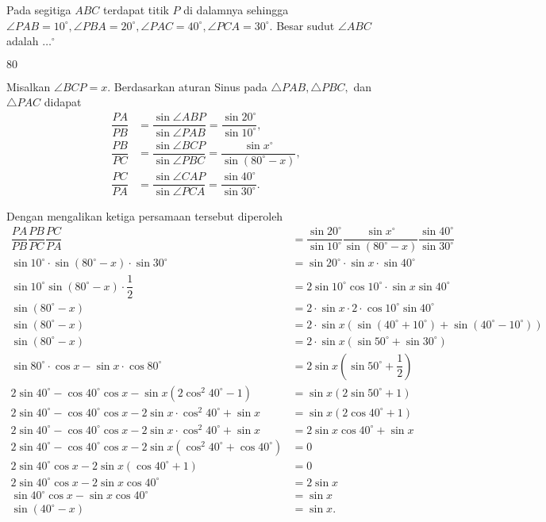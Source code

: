 \documentclass[11pt]{scrartcl}
\begin{document}
	\begin{soalbaru}
		Pada segitiga $ABC$ terdapat titik $P$ di dalamnya sehingga $\angle PAB = 10^\circ, \angle PBA = 20^\circ , \angle PAC = 40^\circ, \angle PCA = 30^\circ$. Besar sudut $\angle ABC$ adalah $\dots^\circ$ 
		
		\begin{jawaban}
				$80$
		\end{jawaban}
		\begin{solusi}
		Misalkan $\angle BCP = x$. Berdasarkan aturan Sinus pada $\triangle PAB, \triangle PBC,$ dan $\triangle PAC$ didapat
		\begin{align*}
		\dfrac{PA}{PB} &= \dfrac{\sin \angle ABP}{\sin \angle PAB} = \dfrac{\sin 20^\circ}{\sin 10^\circ}, \\
		\dfrac{PB}{PC} &= \dfrac{\sin \angle BCP}{\sin \angle PBC} = \dfrac{\sin x^\circ}{\sin (80
		^\circ-x)}, \\
		\dfrac{PC}{PA} &= \dfrac{\sin \angle CAP}{\sin \angle PCA} = \dfrac{\sin 40^\circ}{\sin 30^\circ}.
		\end{align*}
		
		Dengan mengalikan ketiga persamaan tersebut diperoleh
		\begin{align*}
		\dfrac{PA}{PB}\dfrac{PB}{PC}\dfrac{PC}{PA}&=\dfrac{\sin 20^\circ}{\sin 10^\circ}\dfrac{\sin x^\circ}{\sin (80^\circ-x)}\dfrac{\sin 40^\circ}{\sin 30^\circ}\\
		\sin 10^\circ \cdot \sin (80^\circ-x)\cdot \sin 30^\circ &= \sin 20^\circ\cdot \sin x \cdot \sin 40^\circ\\
		\sin 10^\circ \sin (80^\circ-x)\cdot \dfrac{1}{2}&=2\sin 10^\circ \cos 10^\circ\cdot \sin x \sin 40^\circ\\
		\sin (80^\circ-x)&=2\cdot\sin x \cdot 2\cdot \cos 10^\circ \sin 40^\circ\\
		\sin(80^\circ-x)&=2\cdot\sin x(\sin(40^\circ+10^\circ)+\sin(40^\circ-10^\circ))\\
		\sin(80^\circ-x)&=2\cdot\sin x(\sin50^\circ+\sin 30^\circ)\\
		\sin 80^\circ\cdot\cos x-\sin x\cdot \cos 80^\circ &= 2\sin x(\sin 50^\circ +\dfrac{1}{2})\\
		2\sin40^\circ-\cos 40^\circ\cos x-\sin x(2\cos^2 40^\circ-1)&=\sin x(2\sin 50^\circ+1)\\
		2\sin40^\circ-\cos 40^\circ\cos x-2\sin x\cdot\cos^2 40^\circ+\sin x &= \sin x (2 \cos 40^\circ+1)\\
		2\sin40^\circ-\cos 40^\circ\cos x-2\sin x\cdot\cos^2 40^\circ+\sin x &= 2\sin x\cos 40^\circ + \sin x\\
		2\sin40^\circ-\cos 40^\circ\cos x-2\sin x(\cos^2 40^\circ+\cos 40^\circ) &= 0\\
		2 \sin 40^\circ \cos x - 2\sin x(\cos 40^\circ+1)&=0\\
		2\sin 40^\circ\cos x-2\sin x\cos 40^\circ &= 2\sin x\\
		\sin 40^\circ\cos x-\sin x\cos 40^\circ &= \sin x\\
		\sin(40^\circ-x)&=\sin x. 
		\end{align*}
		

\end{solusi}
\end{soalbaru}
\end{document}
